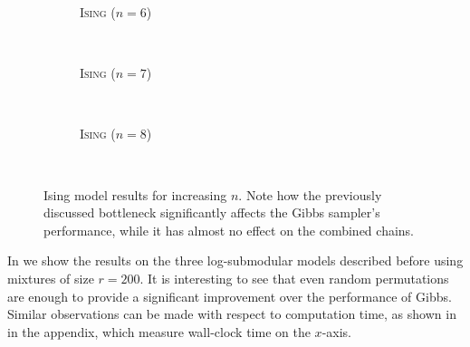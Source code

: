 \setlength{}
\setlength{}
\renewcommand{\subflen}{1.0\textwidth}
\begin{figure}[htbp]
  \begin{subfigure}[b]{\subflen}
    \centering
    
    \vspace{-0.5em}
    \caption{\textsc{Ising} ($n = 6$)}
    \label{fig:ising6}
  \end{subfigure}\\[1em]
  \begin{subfigure}[b]{\subflen}
    \centering
    
    \vspace{-0.5em}
    \caption{\textsc{Ising} ($n = 7$)}
    \label{fig:ising7}
  \end{subfigure}\\[1em]
  \begin{subfigure}[b]{\subflen}
    \centering
    
    \vspace{-0.5em}
    \caption{\textsc{Ising} ($n = 8$)}
    \label{fig:ising8}
  \end{subfigure}\\[-0.5em]
  \caption{
    Ising model results for increasing $n$.
    Note how the previously discussed bottleneck significantly affects the Gibbs sampler's performance, while it has almost no effect on the combined chains.
    }
  \label{fig:expising}
\end{figure}

In  we show the results on the three log-submodular models described before using mixtures of size $r = 200$.
It is interesting to see that even random permutations are enough to provide a significant improvement over the performance of Gibbs.
Similar observations can be made with respect to computation time, as shown in  in the appendix, which measure wall-clock time on the $x$-axis.

